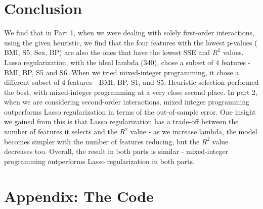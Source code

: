 \documentclass[15pt,a4paper,openright]{article}
\begin{document}
\section{Conclusion}
We find that in Part 1, when we were dealing with solely first-order interactions, using the given heuristic, we find that the four features with the lowest p-values ( BMI, S5, Sex, BP) are also the ones that have the lowest SSE and $R^2$ values. Lasso regularization, with the ideal lambda (340), chose a subset of 4 features - BMI, BP, S5 and S6. When we tried mixed-integer programming, it chose a different subset of 4 features -  BMI, BP, S1, and S5. Heuristic selection performed the best, with mixed-integer programming at a very close second place. In part 2, when we are considering second-order interactions, mixed integer programming outperforms Lasso regularization in terms of the out-of-sample error. One insight we gained from this is that Lasso regularization has a trade-off between the number of features it selects and the $R^2$ value - as we increase lambda, the model becomes simpler with the number of features reducing, but the $R^2$ value decreases too. Overall, the result in both parts is similar - mixed-integer programming outperforms Lasso regularization in both parts. 
\newpage{}

\section{Appendix: The Code}
\end{document}
